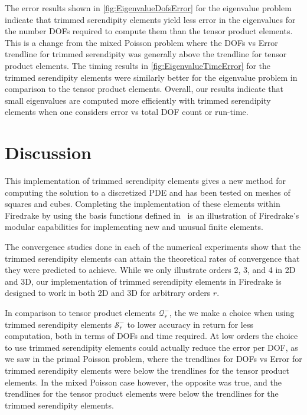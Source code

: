 \documentclass[format=acmsmall,screen,timestamp=false,a4paper]{acmart}
\newcommand{\calQ}{\mathcal{Q}}
\newcommand{\calS}{\mathcal{S}}
\begin{document}
The error results shown in \cref{fig:EigenvalueDofsError} for the eigenvalue problem indicate that trimmed serendipity elements yield less error in the eigenvalues for the number DOFs required to compute them than the tensor product elements.  This is a change from the mixed Poisson problem where the DOFs vs Error trendline for trimmed serendipity was generally above the trendline for tensor product elements.  %
The timing results in \ref{fig:EigenvalueTimeError} for the trimmed serendipity elements were similarly better for the eigenvalue problem in comparison to the tensor product elements. 
Overall, our results indicate that small eigenvalues are computed more efficiently with trimmed serendipity elements when one considers error vs total DOF count or run-time.


\section{Discussion}

This implementation of trimmed serendipity elements gives a new method for computing the solution to a discretized PDE and has been tested on meshes of squares and cubes.  Completing the implementation of these elements within Firedrake by using the basis functions defined in~\cite{gillette2019computational} is an illustration of Firedrake's modular capabilities for implementing new and unusual finite elements. 

The convergence studies done in each of the numerical experiments show that the trimmed serendipity elements can attain the theoretical rates of convergence that they were predicted to achieve.  While we only illustrate orders 2, 3, and 4 in 2D and 3D, our implementation of trimmed serendipity elements in Firedrake is designed to work in both 2D and 3D for arbitrary orders $r$.  

In comparison to tensor product elements $\mathcal{Q}^-_r$, the we make a choice when using trimmed serendipity elements $\mathcal{S}^-_r$ to lower accuracy in return for less computation, both in terms of DOFs and time required.  At low orders the choice to use trimmed serendipity elements could actually reduce the error per DOF, as we saw in the primal Poisson problem, where the trendlines for DOFs vs Error for trimmed serendipity elements were below the trendlines for the tensor product elements.  In the mixed Poisson case however, the opposite was true, and the trendlines for the tensor product elements were below the trendlines for the trimmed serendipity elements.
\end{document}
